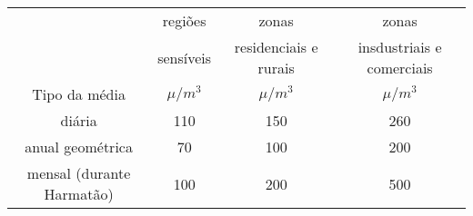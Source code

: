 \begin{tabular}{cccc}
\hline
                              &   regiões  &        zonas       &         zonas               \\
                              & sensíveis  & residenciais e rurais & insdustriais e comerciais      \\
Tipo da média                 & $\mu / m^3$ & $\mu / m^3$ & $\mu / m^3$      \\
\hline
diária                    & 110             & 150                      & 260         \\       
anual geométrica          & 70              & 100                      & 200                   \\
mensal (durante Harmatão) & 100             & 200                      & 500                     \\
\hline
\end{tabular}

